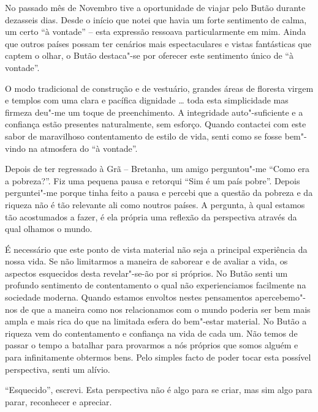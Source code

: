 No passado mês de Novembro tive a oportunidade de viajar pelo Butão
durante dezasseis dias. Desde o início que notei que havia um forte
sentimento de calma, um certo ``à vontade'' -- esta expressão ressoava
particularmente em mim. Ainda que outros países possam ter cenários mais
espectaculares e vistas fantásticas que captem o olhar, o Butão
destaca"-se por oferecer este sentimento único de ``à vontade''.

O modo tradicional de construção e de vestuário, grandes áreas de
floresta virgem e templos com uma clara e pacífica dignidade \ldots{}
toda esta simplicidade mas firmeza deu"-me um toque de preenchimento. A
integridade auto"-suficiente e a confiança estão presentes naturalmente,
sem esforço. Quando contactei com este sabor de maravilhoso
contentamento de estilo de vida, senti como se fosse bem"-vindo na
atmosfera do ``à vontade''.

Depois de ter regressado à Grã -- Bretanha, um amigo perguntou"-me ``Como
era a pobreza?''. Fiz uma pequena pausa e retorqui ``Sim é um país
pobre''. Depois perguntei"-me porque tinha feito a pausa e percebi que a
questão da pobreza e da riqueza não é tão relevante ali como noutros
países. A pergunta, à qual estamos tão acostumados a fazer, é ela
própria uma reflexão da perspectiva através da qual olhamos o mundo.

É necessário que este ponto de vista material não seja a principal
experiência da nossa vida. Se não limitarmos a maneira de saborear e de
avaliar a vida, os aspectos esquecidos desta revelar"-se-ão por si
próprios. No Butão senti um profundo sentimento de contentamento o qual
não experienciamos facilmente na sociedade moderna. Quando estamos
envoltos nestes pensamentos apercebemo"-nos de que a maneira como nos
relacionamos com o mundo poderia ser bem mais ampla e mais rica do que
na limitada esfera do bem"-estar material. No Butão a riqueza vem do
contentamento e confiança na vida de cada um. Não temos de passar o
tempo a batalhar para provarmos a nós próprios que somos alguém e para
infinitamente obtermos bens. Pelo simples facto de poder tocar esta
possível perspectiva, senti um alívio.

``Esquecido'', escrevi. Esta perspectiva não é algo para se criar, mas
sim algo para parar, reconhecer e apreciar.

